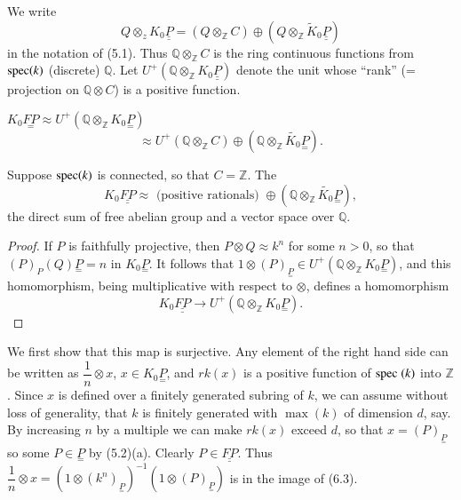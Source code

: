 We write 
$$
Q \otimes_z K_0 \underline{\underline{P}} = (Q \otimes_{\mathbb{Z}}
C)  
\oplus (Q \otimes_{\mathbb{Z}}\tilde{K}_0 \underline{\underline{P}}) 
$$
in the notation of (5.1). Thus $\mathbb{Q} \otimes_{\mathbb{Z}} C$ is the
ring continuous functions from $\operatorname{spec} (k)$ (discrete)
$\mathbb{Q}$. Let $U^+ (\mathbb{Q} \otimes_{\mathbb{Z}} K_0
  \underline{\underline{P}})$ denote the unit whose 
``rank'' (= projection on $\mathbb{Q} \otimes C$) is a positive
  function.   

\setcounter{theorem}{1}
\begin{theorem}%
$K_0 \underset{=}{FP} \approx U^+ (\mathbb{Q} \otimes_{\mathbb{Z}} K_0
  \underset{=}{P})$\pageoriginale 
$$
\approx U^+ (\mathbb{Q} \otimes_{\mathbb{Z}} C ) \oplus (\mathbb{Q}
\otimes_{\mathbb{Z}}\tilde{K_0}\underset{=}{P}).  
$$
\end{theorem}

\begin{example*}%
Suppose $\operatorname{spec} (k)$ is connected, so that $C = \mathbb{Z}$. The  
$$
K_0 \underline{\underline{FP}} \approx \text{ (positive rationals) }
\oplus (\mathbb{Q} \otimes_{\mathbb{Z}} \tilde{K_0} \underset{=}{P}),  
$$
the direct sum of free abelian group and a vector space over
$\mathbb{Q}$.  
\end{example*}

\begin{proof}
If $P$ is faithfully projective, then $P \otimes Q \approx k^n$ for
some $n > 0$, so that $(P)_{\underset{}{P}} (Q){\underset{=}{P}} = n$ in
$K_0{\underset{=}{P}}$. It follows that $1 \otimes (P)_{
  \underset{=}{P}} \in U^+ (\mathbb{Q} \otimes_{\mathbb{Z}} K_0
\underset{=}{P})$, and this homomorphism, being multiplicative with
respect to $\otimes$, defines a homomorphism  
\begin{equation*}
K_0 \underline{\underline{FP}} \to U^+ (\mathbb{Q} \otimes _{\mathbb{Z} } K_0
\underset{=}{P}). \tag{6.3} 
\end{equation*}
\end{proof}

We first show that this map is surjective. Any element of the right
hand side can be written as $\dfrac{1}{n} \otimes x$, $x \in  K_0
\underset{=}{P}$, and $rk(x)$ is a positive function of $\operatorname{spec} \; (k)$
into $\mathbb{Z}$. Since $x$ is defined over a finitely generated
subring of $k$, we can assume without loss of generality, that $k$ is
finitely generated with $\max(k)$ of dimension $d$, say. By increasing
$n$ by a multiple we can make $rk(x)$ exceed $d$, so that $x = (P)
_{\underset{=}{P}}$ so some $P \in \underset{=}{P}$ by (5.2)(a). Clearly $P \in
\underline{\underline{FP}}$. Thus $\dfrac{1}{n} \otimes x = ( 1 \otimes (k^n)
_{\underset{=}{P}})^{-1} (1 \otimes (P)_{\underset{=}{P}})$ is in the
image of (6.3).  


